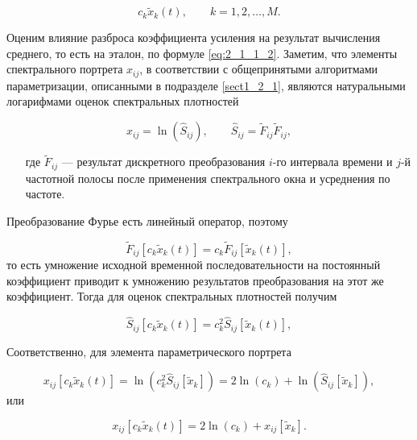 \begin{equation} \label{eq:2_1_2_1}
c_k \tilde{x}_k (t), \qquad k = 1, 2, \dots, M.
\end{equation}

Оценим влияние разброса коэффициента усиления на результат вычисления среднего, то есть на эталон, по формуле \eqref{eq:2_1_1_2}.
Заметим, что элементы спектрального портрета $x_{ij}$, в соответствии с общепринятыми алгоритмами параметризации, описанными в подразделе \ref{sect1_2_1}, являются натуральными логарифмами оценок спектральных плотностей

\begin{equation} \label{eq:2_1_2_2}
x_{ij} = \ln(\widehat{S}_{ij}), \qquad \widehat{S}_{ij} = \tilde{F}_{ij} \tilde{F}_{ij}, 
\end{equation}
\begin{itemize}[align=left,leftmargin=1.8em,itemindent=0pt,labelsep=0pt,labelwidth=1.8em]
	\item[где] $\tilde{F}_{ij}$ --- результат дискретного преобразования $i$-го интервала времени и $j$-й частотной полосы после применения спектрального окна и усреднения по частоте.
\end{itemize}

Преобразование Фурье есть линейный оператор, поэтому

\begin{equation} \label{eq:2_1_2_3}
\tilde{F}_{ij} [c_k \tilde{x}_k (t)] = c_k \tilde{F}_{ij} [\tilde{x}_k (t)],
\end{equation}
то есть умножение исходной временной последовательности на постоянный коэффициент приводит к умножению результатов преобразования на этот же коэффициент.
Тогда для оценок спектральных плотностей получим 

\begin{equation} \label{eq:2_1_2_4}
\widehat{S}_{ij} [c_k \tilde{x}_k (t)] = c_k^2 \widehat{S}_{ij} [\tilde{x}_k (t)],
\end{equation}

Соответственно, для элемента параметрического портрета 

\begin{equation}
x_{ij} [c_k \tilde{x}_k(t)] =
\ln(c_k^2 \widehat{S}_{ij} [\tilde{x}_k]) =
2 \ln(c_k) + \ln(\widehat{S}_{ij} [\tilde{x}_k]),
\end{equation}
или

\begin{equation} \label{eq:2_1_2_5}
x_{ij} [c_k \tilde{x}_k(t)] =
2 \ln(c_k) + x_{ij} [\tilde{x}_k].
\end{equation}

